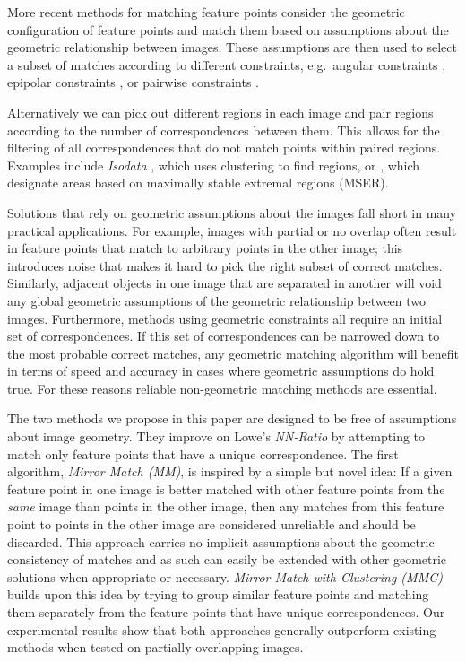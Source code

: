 \documentclass[conference]{IEEEtran}
\begin{document}
More recent methods for matching feature points consider the geometric 
configuration of feature points and match them based on assumptions 
about the geometric relationship between images.  These assumptions are 
then used to select a subset of matches according to different 
constraints, e.g.\ angular constraints \cite{kim2008efficient}, epipolar 
constraints \cite{torr2000mlesac,chum2005matching}, or pairwise 
constraints \cite{choi2009robust,leordeanu2005spectral}.

Alternatively we can pick out different regions in each image and pair 
regions according to the number of correspondences between them.  
This allows for the filtering of all correspondences that do not match 
points within paired regions.  Examples include \emph{Isodata} \cite{das2008event}, which 
uses clustering to find regions, or \cite{wu2011robust}, which designate areas based on maximally stable 
extremal regions (MSER).

Solutions that rely on geometric assumptions about the images fall 
short in many practical applications. For example, images with partial or 
no overlap often result in feature points that match to arbitrary points 
in the other image; this introduces noise that makes it hard to pick the right 
subset of correct matches. Similarly, adjacent objects in one image that 
are separated in another will void any global geometric assumptions of 
the geometric relationship between two images.  Furthermore, methods 
using geometric constraints all require an initial set of 
correspondences. If this set of correspondences can be narrowed down to 
the most probable correct matches, any geometric matching algorithm will 
benefit in terms of speed and accuracy in cases where geometric 
assumptions do hold true. For these reasons reliable non-geometric matching methods are essential.

The two methods we propose in this paper are designed to be free of 
assumptions about image geometry. They improve on Lowe's 
\emph{NN-Ratio} by attempting to match only feature points that have 
a unique correspondence. The first algorithm, \emph{Mirror Match (MM)}, 
is inspired by a simple but novel idea:  If a given feature point in one 
image is better matched with other feature points from the \emph{same} 
image than points in the other image, then any matches from this feature 
point to points in the other image are considered unreliable and should 
be discarded.  This approach carries no implicit assumptions about the 
geometric consistency of matches and as such can easily be extended with 
other geometric solutions when appropriate or necessary. \emph{Mirror 
Match with Clustering (MMC)} builds upon this idea by trying to group 
similar feature points and matching them separately from the feature points 
that have unique correspondences. Our experimental results show that 
both approaches generally outperform existing 
methods when tested on partially overlapping images.
\end{document}
